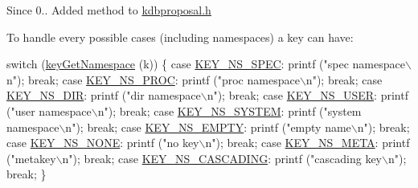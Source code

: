 \begin{DoxySince}{Since}
0.. Added method to \hyperlink{kdbproposal_8h}{kdbproposal.\+h}
\end{DoxySince}
To handle every possible cases (including namespaces) a key can have\+: 
\begin{DoxyCodeInclude}
\textcolor{keywordflow}{switch} (\hyperlink{group__keyname_gafc3ca03ed10f87eb59bdc02cf2a0de8d}{keyGetNamespace} (k))
\{
\textcolor{keywordflow}{case} \hyperlink{group__key_ggaec3b8d6f430ae49b91bafe8a86310a68a2be047b124b1ca0e92b5ef124169f0d2}{KEY\_NS\_SPEC}:
        printf (\textcolor{stringliteral}{"spec namespace\(\backslash\)n"});
        \textcolor{keywordflow}{break};
\textcolor{keywordflow}{case} \hyperlink{group__key_ggaec3b8d6f430ae49b91bafe8a86310a68a470ecc9254fcdfccf9923a3e526c9c11}{KEY\_NS\_PROC}:
        printf (\textcolor{stringliteral}{"proc namespace\(\backslash\)n"});
        \textcolor{keywordflow}{break};
\textcolor{keywordflow}{case} \hyperlink{group__key_ggaec3b8d6f430ae49b91bafe8a86310a68aa0006cf27dbb2586bafba6ff1ae4f4ec}{KEY\_NS\_DIR}:
        printf (\textcolor{stringliteral}{"dir namespace\(\backslash\)n"});
        \textcolor{keywordflow}{break};
\textcolor{keywordflow}{case} \hyperlink{group__key_ggaec3b8d6f430ae49b91bafe8a86310a68a8ce23c70010e8ac8bb540b0947e03a4e}{KEY\_NS\_USER}:
        printf (\textcolor{stringliteral}{"user namespace\(\backslash\)n"});
        \textcolor{keywordflow}{break};
\textcolor{keywordflow}{case} \hyperlink{group__key_ggaec3b8d6f430ae49b91bafe8a86310a68a61adca2f9dff47e65dfcdb492ffa7a20}{KEY\_NS\_SYSTEM}:
        printf (\textcolor{stringliteral}{"system namespace\(\backslash\)n"});
        \textcolor{keywordflow}{break};
\textcolor{keywordflow}{case} \hyperlink{group__key_ggaec3b8d6f430ae49b91bafe8a86310a68a33d6c53529b4e6921d0b1d6565df2f1f}{KEY\_NS\_EMPTY}:
        printf (\textcolor{stringliteral}{"empty name\(\backslash\)n"});
        \textcolor{keywordflow}{break};
\textcolor{keywordflow}{case} \hyperlink{group__key_ggaec3b8d6f430ae49b91bafe8a86310a68a3659698b0a07454ca8055ab693e8efd1}{KEY\_NS\_NONE}:
        printf (\textcolor{stringliteral}{"no key\(\backslash\)n"});
        \textcolor{keywordflow}{break};
\textcolor{keywordflow}{case} \hyperlink{group__key_ggaec3b8d6f430ae49b91bafe8a86310a68ac5fbf2c3a7ae79fa2d60c48ae3e72688}{KEY\_NS\_META}:
        printf (\textcolor{stringliteral}{"metakey\(\backslash\)n"});
        \textcolor{keywordflow}{break};
\textcolor{keywordflow}{case} \hyperlink{group__key_ggaec3b8d6f430ae49b91bafe8a86310a68a2c9133e3095dccbcde5ca3bb13987b5d}{KEY\_NS\_CASCADING}:
        printf (\textcolor{stringliteral}{"cascading key\(\backslash\)n"});
        \textcolor{keywordflow}{break};
\}
\end{DoxyCodeInclude}
